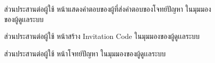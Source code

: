 \documentclass[12pt,one side,openright,a4paper]{cpe-thesis-th}
\begin{document}
\pagebreak
{}
\begin{figure}[H]
  \centering
  \caption[ส่วนประสานต่อผู้ใช้ หน้าแสดงคำตอบของผู้ที่ส่งคำตอบของโจทย์ปัญหา]{ส่วนประสานต่อผู้ใช้ หน้าแสดงคำตอบของผู้ที่ส่งคำตอบของโจทย์ปัญหา ในมุมมองของผู้ดูเเลระบบ}
\end{figure}

\begin{figure}[H]
  \centering
  \caption[ส่วนประสานต่อผู้ใช้ หน้าสร้าง Invitation Code]{ส่วนประสานต่อผู้ใช้ หน้าสร้าง Invitation Code ในมุมมองของผู้ดูเเลระบบ}
  \label{fig:new-ui-setting-invitation2}
\end{figure}

\begin{figure}[H]
  \centering
  \caption[ส่วนประสานต่อผู้ใช้ หน้าโจทย์ปัญหาของผู้ดูเเลระบบ]{ส่วนประสานต่อผู้ใช้ หน้าโจทย์ปัญหา ในมุมมองของผู้ดูเเลระบบ}
  \label{fig:new-ui-assign8}
\end{figure}
\end{document}
